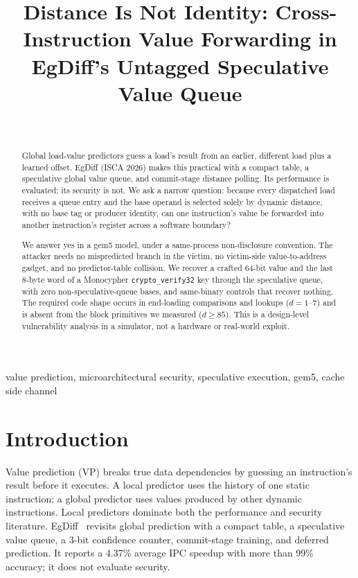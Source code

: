 \documentclass[conference]{IEEEtran}
\title{Distance Is Not Identity: Cross-Instruction Value Forwarding in
EgDiff's Untagged Speculative Value Queue}
\author{\IEEEauthorblockN{Anonymous Submission}\\
\IEEEauthorblockA{Anonymous Workshop on Hardware Security}}
\newcommand{\code}[1]{\texttt{\small #1}}
\begin{document}
\maketitle

\begin{abstract}
Global load-value predictors guess a load's result from an earlier,
different load plus a learned offset. EgDiff (ISCA 2026) makes this
practical with a compact table, a speculative global value queue, and
commit-stage distance polling. Its performance is evaluated; its
security is not. We ask a narrow question: because every dispatched
load receives a queue entry and the base operand is selected solely by
dynamic distance, with no base tag or producer identity, can one
instruction's value be forwarded into another instruction's register
across a software boundary?

We answer yes in a gem5 model, under a same-process non-disclosure
convention. The attacker needs no mispredicted branch in the victim, no
victim-side value-to-address gadget, and no predictor-table collision.
We recover a crafted 64-bit value and the last 8-byte word of a
Monocypher \code{crypto\_verify32} key through the speculative queue,
with zero non-speculative-queue bases, and same-binary controls that
recover nothing. The required code shape occurs in end-loading
comparisons and lookups ($d=1$--$7$) and is absent from the block
primitives we measured ($d\ge 85$). This is a design-level
vulnerability analysis in a simulator, not a hardware or real-world
exploit.
\end{abstract}

\begin{IEEEkeywords}
value prediction, microarchitectural security, speculative execution,
gem5, cache side channel
\end{IEEEkeywords}

\section{Introduction}

Value prediction (VP) breaks true data dependencies by guessing an
instruction's result before it executes. A local predictor uses the
history of one static instruction; a global predictor uses values
produced by other dynamic instructions. Local predictors dominate both
the performance and security literature. EgDiff~\cite{egdiff} revisits
global prediction with a compact table, a speculative value queue, a
3-bit confidence counter, commit-stage training, and deferred
prediction. It reports a 4.37\% average IPC speedup with more than 99\%
accuracy; it does not evaluate security.
\end{document}
